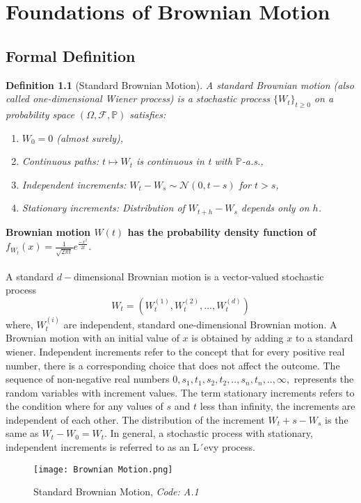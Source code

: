\documentclass[12pt]{report}
\newtheorem{definition}[theorem]{Definition}
\begin{document}
\chapter{Foundations of Brownian Motion}
\section{Formal Definition}
\begin{definition}[Standard Brownian Motion]
A standard Brownian motion (also called one-dimensional Wiener process) is a stochastic process \(\{W_t\}_{t \geq 0}\) on a probability space \((\Omega, \mathcal{F}, \mathbb{P})\) satisfies:
\begin{enumerate}
    \item \(W_0 = 0\) (almost surely),
    \item Continuous paths: \(t \mapsto W_t\) is continuous in t with \(\mathbb{P}\)-a.s.,
    \item Independent increments: \(W_{t} - W_s \sim \mathcal{N}(0, t-s)\) for \(t > s\),
    \item Stationary increments: Distribution of \(W_{t+h} - W_s\) depends only on \(h\).
\end{enumerate}
\end{definition}
\noindent
\textbf{Brownian motion $W(t)$ has the probability density function of}  $f_{W_{t}}(x) = \frac{1}{\sqrt{2 \pi t}}e^{\frac{-x^2}{2t}} $.\\
\\
\noindent
A standard $d-$dimensional Brownian motion is a vector-valued stochastic process
\[
W_t =  (W^{(1)}_t ,W^{(2)}_t ,..., W^{(d)}_t )
\]
where, $W^{(i)}_t$ are independent, standard one-dimensional Brownian motion. A Brownian motion with an initial value of $x$ is obtained by adding $x$ to a standard wiener. Independent increments refer to the concept that for every positive real number, there is a corresponding choice that does not affect the outcome. The sequence of non-negative real numbers $ 0, s_1, t_1, s_2, t_2,.., s_n, t_n,.., \infty,$ represents the random variables with increment values. The term stationary increments refers to the condition where for any values of $s$ and $t$ less than infinity, the increments are independent of each other. The distribution of the increment $W_t+s - W_s$ is the same as $W_t-W_0 = W_t$. In general, a stochastic process with stationary, independent increments is referred to as an L´evy process. 

\begin{figure}[H]
    \centering
    \texttt{[image: Brownian Motion.png]}
    \caption{Standard Brownian Motion, \textit{Code: A.1}}
    \label{fig:enter-label}
\end{figure}
\end{document}
